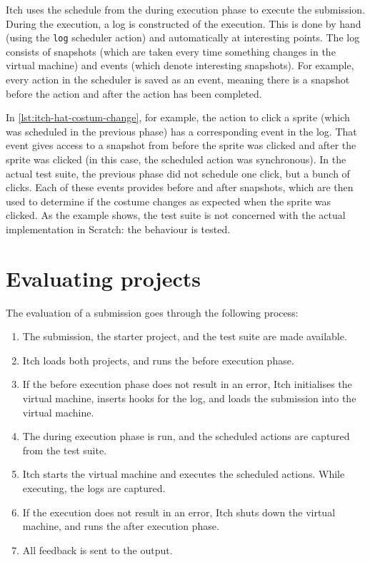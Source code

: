 \documentclass[../main]{subfiles}
\begin{document}
Itch uses the schedule from the during execution phase to execute the submission.
During the execution, a log is constructed of the execution.
This is done by hand (using the \texttt{log} scheduler action) and automatically at interesting points.
The log consists of snapshots (which are taken every time something changes in the virtual machine) and events (which denote interesting snapshots).
For example, every action in the scheduler is saved as an event, meaning there is a snapshot before the action and after the action has been completed.

In \cref{lst:itch-hat-costum-change}, for example, the action to click a sprite (which was scheduled in the previous phase) has a corresponding event in the log.
That event gives access to a snapshot from before the sprite was clicked and after the sprite was clicked (in this case, the scheduled action was synchronous).
In the actual test suite, the previous phase did not schedule one click, but a bunch of clicks.
Each of these events provides before and after snapshots, which are then used to determine if the costume changes as expected when the sprite was clicked.
As the example shows, the test suite is not concerned with the actual implementation in Scratch: the behaviour is tested.

\section{Evaluating projects}\label{sec:itch-evaluating-projects}

The evaluation of a submission goes through the following process:

\begin{enumerate}
    \item The submission, the starter project, and the test suite are made available.
    \item Itch loads both projects, and runs the before execution phase.
    \item If the before execution phase does not result in an error, Itch initialises the virtual machine, inserts hooks for the log, and loads the submission into the virtual machine.
    \item The during execution phase is run, and the scheduled actions are captured from the test suite.
    \item Itch starts the virtual machine and executes the scheduled actions.
          While executing, the logs are captured.
    \item If the execution does not result in an error, Itch shuts down the virtual machine, and runs the after execution phase.
    \item All feedback is sent to the output.
\end{enumerate}
\end{document}
